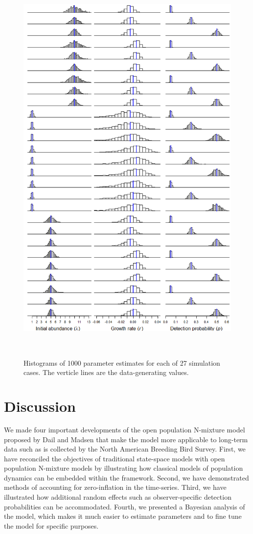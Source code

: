 \documentclass[12pt]{article}
\begin{document}
\begin{figure}
  \centering
  \includegraphics[height=8in]{figs/exp_hists}
  \caption{Histograms of 1000 parameter estimates for each of 27 simulation cases. The verticle lines are the data-generating values.}
\label{fig:exp_hists}
\end{figure}

\section{Discussion}



We made four important developments of the open population
N-mixture model proposed by Dail and Madsen that make the
model more applicable to long-term data such as is collected
by the North American Breeding Bird Survey. First, we have
reconciled the objectives of traditional state-space models
with open population N-mixture models by illustrating how
classical models of population dynamics can be embedded within
the framework. Second, we have demonstrated methods of
accounting for zero-inflation in the time-series. Third, we
have illustrated how additional random effects such as
observer-specific detection probabilities can be
accommodated. Fourth, we presented a Bayesian analysis of the
model, which makes it much easier to estimate parameters and
to fine tune the model for specific purposes.
\end{document}
